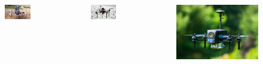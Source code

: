 \documentclass[aspectratio=169,9pt]{beamer}
\begin{document}
\begin{frame}
\begin{columns}[c]
    \vspace{-1em}

    \begin{figure}
      \centering
      \includegraphics[width=1.0\textwidth]{./fig/uavs/f550_real.jpg}
    \end{figure}


    \begin{figure}
      \centering
      \includegraphics[width=1.0\textwidth]{./fig/uavs/x500_real.jpg}
    \end{figure}

    \vspace{-1em}

    \begin{figure}
      \centering
      \includegraphics[width=1.0\textwidth]{./fig/uavs/ecodrone.jpg}
    \end{figure}


\end{columns}
\end{frame}
\end{document}
